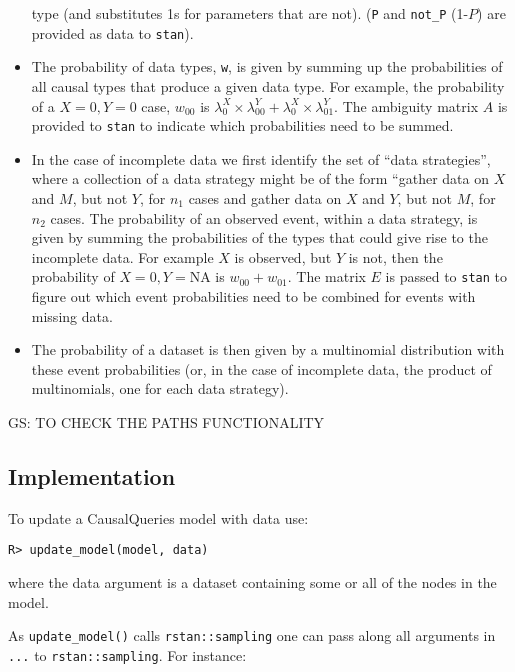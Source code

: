 \documentclass[
  11pt,
  article]{jss}
\begin{document}
\begin{itemize}
  type (and substitutes 1s for parameters that are not). (\texttt{P} and
  \texttt{not\_P} (1-\(P\)) are provided as data to \texttt{stan}).
\item
  The probability of data types, \texttt{w}, is given by summing up the
  probabilities of all causal types that produce a given data type. For
  example, the probability of a \(X=0,Y=0\) case, \(w_{00}\) is
  \(\lambda^X_0\times \lambda^Y_{00} + \lambda^X_0\times \lambda^Y_{01}\).
  The ambiguity matrix \(A\) is provided to \texttt{stan} to indicate
  which probabilities need to be summed.
\item
  In the case of incomplete data we first identify the set of ``data
  strategies'', where a collection of a data strategy might be of the
  form ``gather data on \(X\) and \(M\), but not \(Y\), for \(n_1\)
  cases and gather data on \(X\) and \(Y\), but not \(M\), for \(n_2\)
  cases. The probability of an observed event, within a data strategy,
  is given by summing the probabilities of the types that could give
  rise to the incomplete data. For example \(X\) is observed, but \(Y\)
  is not, then the probability of \(X=0, Y = \text{NA}\) is
  \(w_{00} +w_{01}\). The matrix \(E\) is passed to \texttt{stan} to
  figure out which event probabilities need to be combined for events
  with missing data.
\item
  The probability of a dataset is then given by a multinomial
  distribution with these event probabilities (or, in the case of
  incomplete data, the product of multinomials, one for each data
  strategy).
\end{itemize}

GS: TO CHECK THE PATHS FUNCTIONALITY

\hypertarget{implementation}{%
\subsection{Implementation}\label{implementation}}

To update a CausalQueries model with data use:

\begin{verbatim}
R> update_model(model, data)
\end{verbatim}

where the data argument is a dataset containing some or all of the nodes
in the model.

As \texttt{update\_model()} calls \texttt{rstan::sampling} one can pass
along all arguments in \texttt{...} to \texttt{rstan::sampling}. For
instance:
\end{document}
